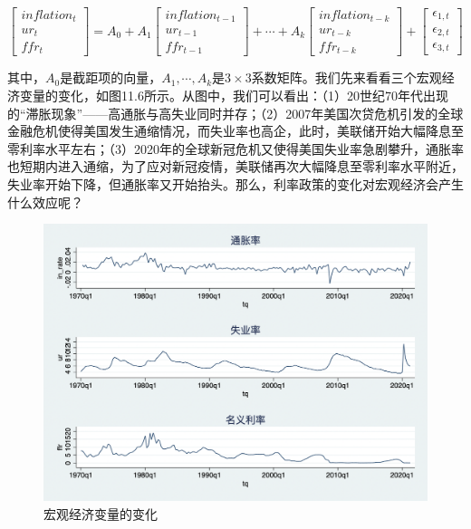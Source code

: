\documentclass[cn,12pt,math=newtx,citestyle=gb7714-2015,bibstyle=gb7714-2015]{elegantbook}
\begin{document}
    \begin{equation}
    	\left[
    	\begin{array}{c}
    		inflation_t \\
    		ur_t \\
    		ffr_t 
    	\end{array}
    	\right]
    	=A_0 +A_1
    	\left[
    	\begin{array}{c}
    	inflation_{t-1} \\
    	ur_{t-1} \\
    	ffr_{t-1} 
    		\end{array}
    	\right]
    	+ \cdots+A_k
    	\left[
    	\begin{array}{c}
    	inflation_{t-k} \\
    	ur_{t-k} \\
    	ffr_{t-k} 
    \end{array}
    	\right]
    	+
    	\left[
    	\begin{array}{c}
    	\epsilon_{1,t} \\
    	\epsilon_{2,t} \\
    	\epsilon_{3,t} 
    \end{array}
    	\right]
    \end{equation}
    
    其中，$A_0$是截距项的向量，$A_1,\cdots, A_k$是$3 \times 3$系数矩阵。我们先来看看三个宏观经济变量的变化，如图11.6所示。从图中，我们可以看出：（1）20世纪70年代出现的“滞胀现象”——高通胀与高失业同时并存；（2）2007年美国次贷危机引发的全球金融危机使得美国发生通缩情况，而失业率也高企，此时，美联储开始大幅降息至零利率水平左右；（3）2020年的全球新冠危机又使得美国失业率急剧攀升，通胀率也短期内进入通缩，为了应对新冠疫情，美联储再次大幅降息至零利率水平附近，失业率开始下降，但通胀率又开始抬头。那么，利率政策的变化对宏观经济会产生什么效应呢？
    
    \begin{figure}[tbph]
    	\centering
    	\includegraphics[width=1\linewidth]{var_ts}
    	\caption{宏观经济变量的变化}
    	\label{fig:varts}
    \end{figure}
    
\end{document}
